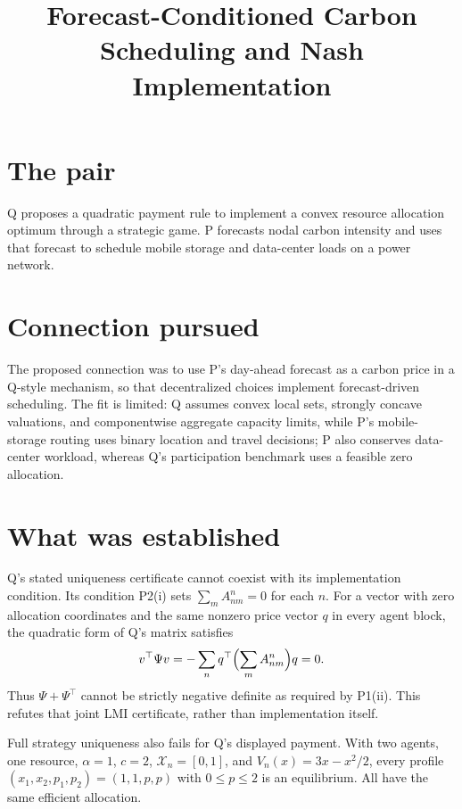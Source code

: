 \documentclass{article}
\title{Forecast-Conditioned Carbon Scheduling and Nash Implementation}
\begin{document}
\maketitle

\section*{The pair}

Q proposes a quadratic payment rule to implement a convex resource allocation optimum through a strategic game. P forecasts nodal carbon intensity and uses that forecast to schedule mobile storage and data-center loads on a power network.

\section*{Connection pursued}

The proposed connection was to use P's day-ahead forecast as a carbon price in a Q-style mechanism, so that decentralized choices implement forecast-driven scheduling. The fit is limited: Q assumes convex local sets, strongly concave valuations, and componentwise aggregate capacity limits, while P's mobile-storage routing uses binary location and travel decisions; P also conserves data-center workload, whereas Q's participation benchmark uses a feasible zero allocation. 

\section*{What was established}

\begin{objection}
Q's stated uniqueness certificate cannot coexist with its implementation condition. Its condition P2(i) sets \(\sum_m A_{nm}^n=0\) for each \(n\). For a vector with zero allocation coordinates and the same nonzero price vector \(q\) in every agent block, the quadratic form of Q's matrix satisfies
\[
v^\top\Psi v
=-\sum_n q^\top\Bigl(\sum_m A_{nm}^n\Bigr)q=0.
\]
Thus \(\Psi+\Psi^\top\) cannot be strictly negative definite as required by P1(ii). This refutes that joint LMI certificate, rather than implementation itself. 
\end{objection}

Full strategy uniqueness also fails for Q's displayed payment. With two agents, one resource, \(\alpha=1\), \(c=2\), \(\mathcal X_n=[0,1]\), and \(V_n(x)=3x-x^2/2\), every profile \((x_1,x_2,p_1,p_2)=(1,1,p,p)\) with \(0\leq p\leq2\) is an equilibrium. All have the same efficient allocation. 
\end{document}

